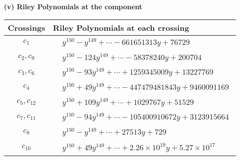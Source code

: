\documentclass[1p]{elsarticle_modified}
\theoremstyle{definition}
\begin{document}
\newpage\renewcommand{\arraystretch}{1}
\flushleft \textbf{(v) Riley Polynomials at the component}\newline \\
\begin{tabular}{m{50pt}|m{274pt}}
Crossings & \hspace{64pt}Riley Polynomials at each crossing \\
\hline $$\begin{aligned}c_{1}\end{aligned}$$&$\begin{aligned}
&y^{150}- y^{149}+\cdots-661651313 y+76729
\end{aligned}$\\
\hline $$\begin{aligned}c_{2},c_{9}\end{aligned}$$&$\begin{aligned}
&y^{150}-124 y^{149}+\cdots-58378240 y+200704
\end{aligned}$\\
\hline $$\begin{aligned}c_{3},c_{6}\end{aligned}$$&$\begin{aligned}
&y^{150}-93 y^{149}+\cdots+1259345009 y+13227769
\end{aligned}$\\
\hline $$\begin{aligned}c_{4}\end{aligned}$$&$\begin{aligned}
&y^{150}+49 y^{149}+\cdots-447479481843 y+9460091169
\end{aligned}$\\
\hline $$\begin{aligned}c_{5},c_{12}\end{aligned}$$&$\begin{aligned}
&y^{150}+109 y^{149}+\cdots+1029767 y+51529
\end{aligned}$\\
\hline $$\begin{aligned}c_{7},c_{11}\end{aligned}$$&$\begin{aligned}
&y^{150}-94 y^{149}+\cdots-105400910672 y+3123915664
\end{aligned}$\\
\hline $$\begin{aligned}c_{8}\end{aligned}$$&$\begin{aligned}
&y^{150}- y^{149}+\cdots+27513 y+729
\end{aligned}$\\
\hline $$\begin{aligned}c_{10}\end{aligned}$$&$\begin{aligned}
&y^{150}+49 y^{149}+\cdots+2.26\times10^{19} y+5.27\times10^{17}
\end{aligned}$\\
\hline
\end{tabular}\\~\\
\end{document}
